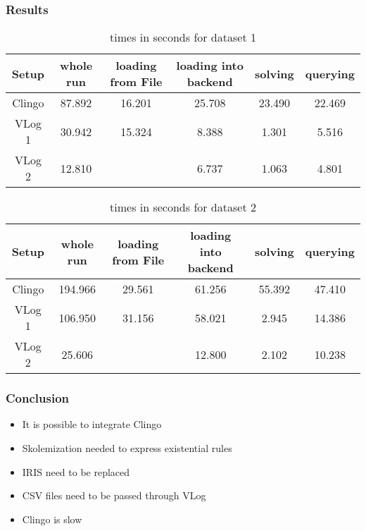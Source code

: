 \documentclass{beamer}
\begin{document}


\begin{frame}
\frametitle{Results}
{
\begin{table}
\center
\begin{tabular}{|c|c|c|c|c|c|}
\hline
Setup & whole run & loading from File & loading into backend & solving & querying \\
\hline
\hline
Clingo & 87.892 & 16.201 & 25.708 & 23.490 & 22.469 \\
VLog 1 & 30.942 & 15.324 & 8.388 & 1.301 & 5.516 \\
VLog 2 & 12.810 &        & 6.737 & 1.063 & 4.801 \\
\hline

\end{tabular}
\caption{times in seconds for dataset 1}
\end{table}
}

{
\begin{table}
\center
\begin{tabular}{|c|c|c|c|c|c|}
\hline
Setup & whole run & loading from File & loading into backend & solving & querying \\
\hline
\hline
Clingo & 194.966 & 29.561 & 61.256 & 55.392 & 47.410 \\
VLog 1 & 106.950 & 31.156 & 58.021 & 2.945 & 14.386 \\
VLog 2 & 25.606  &        & 12.800 & 2.102 & 10.238 \\
\hline

\end{tabular}
\caption{times in seconds for dataset 2}
\end{table}
}
\end{frame}

\begin{frame}
\frametitle{Conclusion}
\begin{itemize}
\item It is possible to integrate Clingo
\item Skolemization needed to express existential rules
\item IRIS need to be replaced
\item CSV files need to be passed through VLog
\item Clingo is slow
\end{itemize}
\end{frame}
\end{document}
